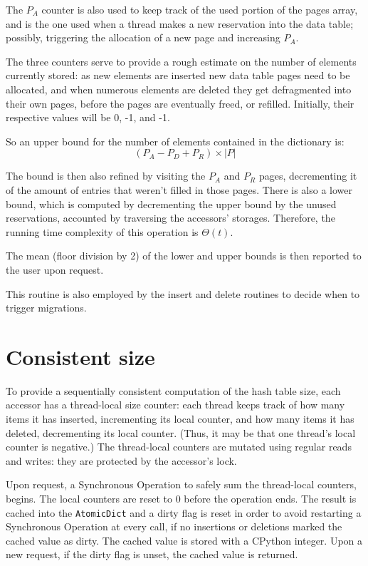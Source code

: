 The $P_A$ counter is also used to keep track of the used portion of the pages array, and is the one used when a thread makes a new reservation into the data table; possibly, triggering the allocation of a new page and increasing $P_A$.

The three counters serve to provide a rough estimate on the number of elements currently stored: as new elements are inserted new data table pages need to be allocated, and when numerous elements are deleted they get defragmented into their own pages, before the pages are eventually freed, or refilled.
Initially, their respective values will be 0, -1, and -1.

So an upper bound for the number of elements contained in the dictionary is:
\[
    (P_A - P_D + P_R) \times |P|
\]

The bound is then also refined by visiting the $P_A$ and $P_R$ pages, decrementing it of the amount of entries that weren't filled in those pages.
There is also a lower bound, which is computed by decrementing the upper bound by the unused reservations, accounted by traversing the accessors' storages.
Therefore, the running time complexity of this operation is $\Theta(t)$.

The mean (floor division by 2) of the lower and upper bounds is then reported to the user upon request.

This routine is also employed by the insert and delete routines to decide when to trigger migrations.


\section{Consistent size}\label{sec:consistent-size}

To provide a sequentially consistent computation of the hash table size, each accessor has a thread-local size counter: each thread keeps track of how many items it has inserted, incrementing its local counter, and how many items it has deleted, decrementing its local counter.
(Thus, it may be that one thread's local counter is negative.)
The thread-local counters are mutated using regular reads and writes: they are protected by the accessor's lock.

Upon request, a Synchronous Operation to safely sum the thread-local counters, begins.
The local counters are reset to 0 before the operation ends.
The result is cached into the \texttt{AtomicDict} and a dirty flag is reset in order to avoid restarting a Synchronous Operation at every call, if no insertions or deletions marked the cached value as dirty.
The cached value is stored with a CPython integer.
Upon a new request, if the dirty flag is unset, the cached value is returned.

